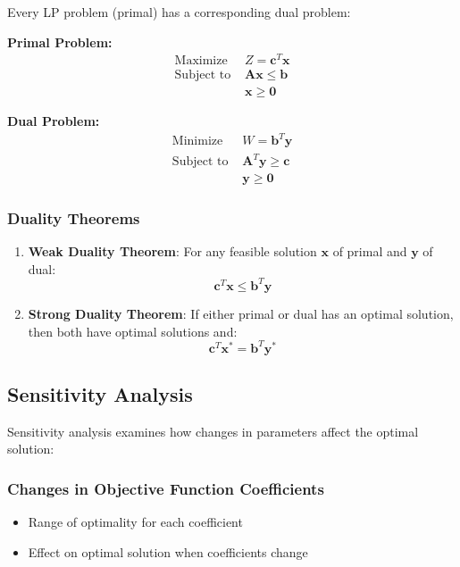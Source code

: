 \documentclass[
  letterpaper,
  DIV=11,
  numbers=noendperiod]{scrreprt}
\providecommand{\tightlist}{%
  \setlength{\itemsep}{0pt}\setlength{\parskip}{0pt}}
\begin{document}
Every LP problem (primal) has a corresponding dual problem:

\textbf{Primal Problem:} \[
\begin{aligned}
\text{Maximize } & Z = \mathbf{c}^T\mathbf{x} \\
\text{Subject to } & \mathbf{A}\mathbf{x} \leq \mathbf{b} \\
& \mathbf{x} \geq \mathbf{0}
\end{aligned}
\]

\textbf{Dual Problem:} \[
\begin{aligned}
\text{Minimize } & W = \mathbf{b}^T\mathbf{y} \\
\text{Subject to } & \mathbf{A}^T\mathbf{y} \geq \mathbf{c} \\
& \mathbf{y} \geq \mathbf{0}
\end{aligned}
\]

\subsubsection{Duality Theorems}\label{duality-theorems}

\begin{enumerate}
\def\labelenumi{\arabic{enumi}.}
\item
  \textbf{Weak Duality Theorem}: For any feasible solution
  \(\mathbf{x}\) of primal and \(\mathbf{y}\) of dual: \[
  \mathbf{c}^T\mathbf{x} \leq \mathbf{b}^T\mathbf{y}
    \]
\item
  \textbf{Strong Duality Theorem}: If either primal or dual has an
  optimal solution, then both have optimal solutions and: \[
  \mathbf{c}^T\mathbf{x}^* = \mathbf{b}^T\mathbf{y}^*
    \]
\end{enumerate}

\subsection{Sensitivity Analysis}\label{sensitivity-analysis}

Sensitivity analysis examines how changes in parameters affect the
optimal solution:

\subsubsection{Changes in Objective Function
Coefficients}\label{changes-in-objective-function-coefficients}

\begin{itemize}
\tightlist
\item
  Range of optimality for each coefficient
\item
  Effect on optimal solution when coefficients change
\end{itemize}
\end{document}
